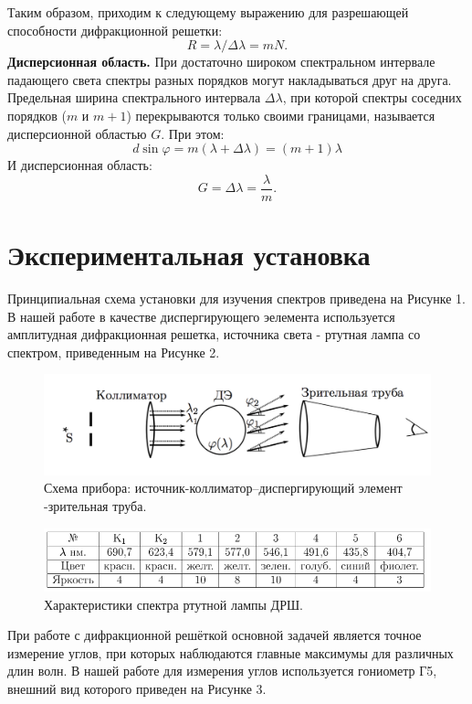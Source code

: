 \documentclass{article}
\begin{document}
Таким образом, приходим к следующему выражению для разрешающей способности дифракционной решетки:
\[R = \lambda / \Delta \lambda = mN .\]
\textbf{Дисперсионная область.} При достаточно широком спектральном интервале падающего света спектры разных порядков могут накладываться друг на друга. Предельная ширина спектрального интервала $ \Delta\lambda$, при которой спектры соседних порядков ($m$ и $m + 1$) перекрываются только своими границами, называется дисперсионной областью $G$. При этом:
\[
d \sin \varphi = m (\lambda + \Delta \lambda) = (m + 1) \lambda
\]
И дисперсионная область:
\[
G = \Delta \lambda = \frac{\lambda}{m}.
\]
\section{Экспериментальная установка}
Принципиальная схема установки для изучения спектров приведена на Рисунке 1. В нашей работе в качестве диспергирующего эелемента используется амплитудная дифракционная решетка, источника света - ртутная лампа со спектром, приведенным на Рисунке 2.  

\begin{figure}[h!]
	\includegraphics[scale=0.6]{sheme.png}
	\centering
	\caption{Схема прибора: источник-коллиматор–диспергирующий элемент -зрительная труба.}
\end{figure}


\begin{figure}[h!]
	\includegraphics[scale=0.8]{lamp_spectr.png}
	\centering
	\caption{Характеристики спектра ртутной лампы ДРШ.}
\end{figure}

При работе с дифракционной решёткой основной задачей является точное измерение углов, при которых наблюдаются главные максимумы для различных длин волн. В нашей работе для измерения углов используется гониометр Г5, внешний вид которого приведен на Рисунке 3.
\end{document}

